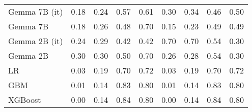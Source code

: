 \begin{tabular}{lllllllll}
Gemma 7B (it) & 0.18 & 0.24 & 0.57 & 0.61 & 0.30 & 0.34 & \cellcolor{orange!14.6} 0.46 & 0.50 \\
Gemma 7B & 0.18 & 0.26 & 0.48 & 0.70 & 0.15 & \cellcolor{cyan!3.4} 0.23 & 0.49 & 0.49 \\
Gemma 2B (it) & 0.24 & \cellcolor{orange!14.2} 0.29 & \cellcolor{orange!25.0} 0.42 & 0.42 & \cellcolor{orange!25.0} 0.70 & \cellcolor{orange!25.0} 0.70 & 0.54 & \cellcolor{orange!25.0} 0.30 \\
Gemma 2B & \cellcolor{orange!25.0} 0.30 & \cellcolor{orange!25.0} 0.30 & 0.50 & 0.70 & 0.26 & 0.28 & 0.54 & \cellcolor{orange!25.0} 0.30 \\
LR & 0.03 & 0.19 & 0.70 & 0.72 & 0.03 & 0.19 & 0.70 & 0.72 \\
GBM & 0.01 & 0.14 & 0.83 & 0.80 & 0.01 & 0.14 & 0.83 & 0.80 \\
XGBoost & 0.00 & 0.14 & 0.84 & 0.80 & 0.00 & 0.14 & 0.84 & 0.80 \\
\bottomrule
\end{tabular}

